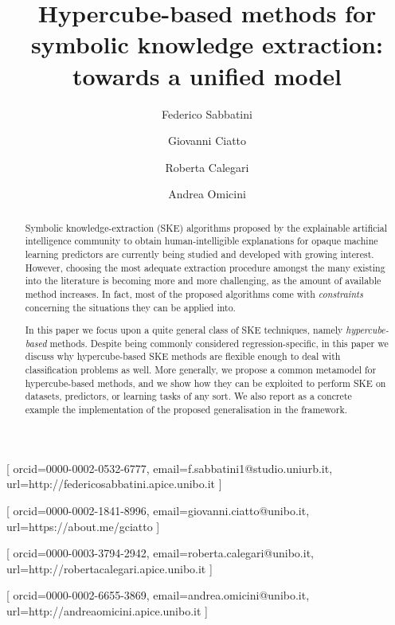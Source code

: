 \documentclass[
]{ceurart}
\begin{document}


\title{Hypercube-based methods for symbolic knowledge extraction: towards a unified model}

\author[1]{Federico Sabbatini}[%
orcid=0000-0002-0532-6777,
email=f.sabbatini1@studio.uniurb.it,
url=http://federicosabbatini.apice.unibo.it
]\cormark[1]
\address[1]{Dipartimento di Scienze Pure e Applicate (DiSPeA), Universit\`a di Urbino, Italy}

\author[2]{Giovanni Ciatto}[%
orcid=0000-0002-1841-8996,
email=giovanni.ciatto@unibo.it,
url=https://about.me/gciatto
]
\address[2]{Dipartimento di Informatica -- Scienza e Ingegneria (DISI), \textsc{Alma Mater Studiorum}---Universit\`a di Bologna, Italy}

\author[3]{Roberta Calegari}[%
orcid=0000-0003-3794-2942,
email=roberta.calegari@unibo.it,
url=http://robertacalegari.apice.unibo.it
]
\address[3]{Alma Mater Research Institute for Human-Centered Artificial Intelligence, \textsc{Alma Mater Studiorum}---Universit\`a di Bologna, Italy}

\author[2]{Andrea Omicini}[%
orcid=0000-0002-6655-3869,
email=andrea.omicini@unibo.it,
url=http://andreaomicini.apice.unibo.it
]


\begin{abstract}
Symbolic knowledge-extraction (SKE) algorithms proposed by the explainable artificial intelligence community to obtain human-intelligible explanations for opaque machine learning predictors are currently being studied and developed with growing interest.
%
However, choosing the most adequate extraction procedure amongst the many existing into the literature is becoming more and more challenging, as the amount of available method increases.
%
In fact, most of the proposed algorithms come with \emph{constraints} concerning the situations they can be applied into.

In this paper we focus upon a quite general class of SKE techniques, namely \emph{hypercube-based} methods.
%
Despite being commonly considered regression-specific, in this paper we discuss why hypercube-based SKE methods are flexible enough to deal with classification problems as well.
%
More generally, we propose a common metamodel for hypercube-based methods, and we show how they can be exploited to perform SKE on datasets, predictors, or learning tasks of any sort.
%
%
We also report as a concrete example the implementation of the proposed generalisation in the \psyke{} framework.
\end{abstract}
\end{document}
